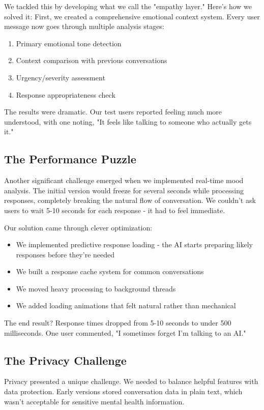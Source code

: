 \documentclass[12pt]{article}
\begin{document}
We tackled this by developing what we call the "empathy layer." Here's how we solved it:
First, we created a comprehensive emotional context system. Every user message now goes through multiple analysis stages:
\begin{enumerate}
    \item Primary emotional tone detection
    \item Context comparison with previous conversations
    \item Urgency/severity assessment
    \item Response appropriateness check
\end{enumerate}

The results were dramatic. Our test users reported feeling much more understood, with one noting, "It feels like talking to someone who actually gets it."

\subsection{The Performance Puzzle}
Another significant challenge emerged when we implemented real-time mood analysis. The initial version would freeze for several seconds while processing responses, completely breaking the natural flow of conversation. We couldn't ask users to wait 5-10 seconds for each response - it had to feel immediate.

Our solution came through clever optimization:
\begin{itemize}
    \item We implemented predictive response loading - the AI starts preparing likely responses before they're needed
    \item We built a response cache system for common conversations
    \item We moved heavy processing to background threads
    \item We added loading animations that felt natural rather than mechanical
\end{itemize}

The end result? Response times dropped from 5-10 seconds to under 500 milliseconds. One user commented, "I sometimes forget I'm talking to an AI."

\subsection{The Privacy Challenge}
Privacy presented a unique challenge. We needed to balance helpful features with data protection. Early versions stored conversation data in plain text, which wasn't acceptable for sensitive mental health information.
\end{document}
